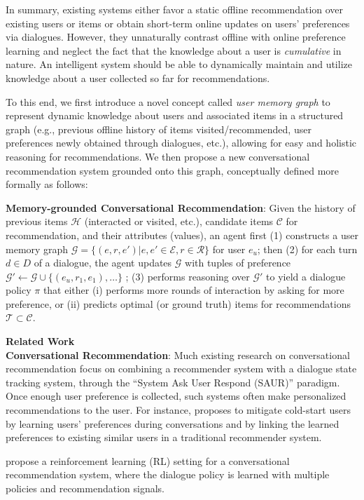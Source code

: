 In summary, existing systems either favor a static offline recommendation over existing users or items or obtain short-term online updates on users' preferences via dialogues.
However, they unnaturally contrast offline with online preference learning and neglect the fact that the knowledge about a user is \textit{cumulative} in nature.
An intelligent system should be able to dynamically maintain and utilize knowledge about a user collected so far for recommendations.

To this end, we first introduce a novel concept called \textit{user memory graph} to represent dynamic knowledge about users and associated items in a structured graph (e.g., previous offline history of items visited/recommended, user preferences newly obtained through dialogues, etc.), allowing for easy and holistic reasoning for recommendations.
We then propose a new conversational recommendation system grounded onto this graph, conceptually defined more formally as follows:

\noindent\textbf{Memory-grounded Conversational Recommendation}:
Given the history of previous items $\mathcal{H}$ (interacted or visited, etc.), candidate items $\mathcal{C}$ for recommendation, and their attributes (values), 
an agent first (1) constructs a user memory graph $\mathcal{G} = \{(e, r, e')\vert e, e' \in \mathcal{E}, r \in \mathcal{R} \}$ for user $e_u$; 
then (2) for each turn $d \in D$ of a dialogue, the agent updates $\mathcal{G}$ with tuples of preference $\mathcal{G}' \gets \mathcal{G} \cup \{(e_u, r_1, e_1), \dots\}$ ;
(3) performs reasoning over $\mathcal{G}'$ to yield a dialogue policy $\pi$ that
either (i) performs more rounds of interaction by asking for more preference, 
or (ii) predicts optimal (or ground truth) items for recommendations $\mathcal{T} \subset \mathcal{C}$.

\textbf{Related Work}\\
\textbf{Conversational Recommendation}:
Much existing research on conversational recommendation focus on combining a recommender system with a dialogue state tracking system, through the ``System Ask User Respond (SAUR)'' paradigm.
Once enough user preference is collected, such systems often make personalized recommendations to the user.
For instance, \cite{li2018towards} proposes to mitigate cold-start users by learning users' preferences during conversations and by linking the learned preferences to existing similar users in a traditional recommender system.

\cite{sun2018conversational,kang2019recommendation} propose a reinforcement learning (RL) setting for a conversational recommendation system, where the dialogue policy is learned with multiple policies and recommendation signals.

